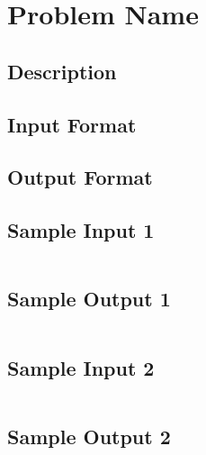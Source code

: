 

\begin{center}\end{center}
\vspace{5mm}


\section{Problem Name}

\subsection*{Description}

\subsection*{Input Format}

\subsection*{Output Format}

\subsection*{Sample Input 1}
\begin{verbatim}
\end{verbatim}

\subsection*{Sample Output 1}
\begin{verbatim}
\end{verbatim}

\subsection*{Sample Input 2}
\begin{verbatim}
\end{verbatim}

\subsection*{Sample Output 2}
\begin{verbatim}
\end{verbatim}


\newpage




